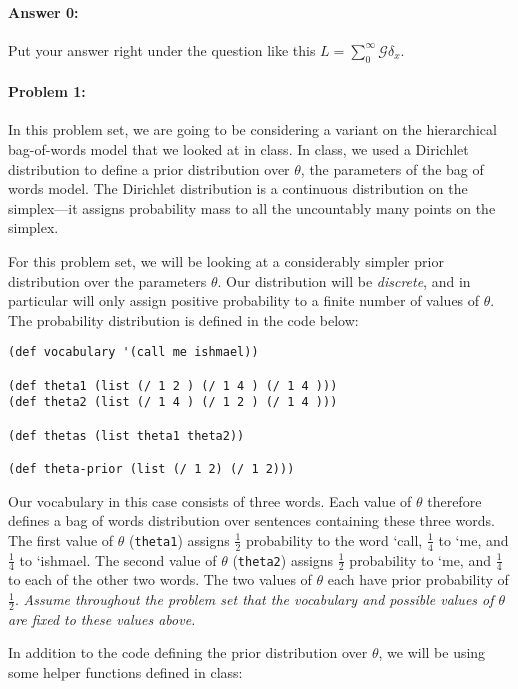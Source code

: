 \documentclass[10pt]{article}
\begin{document}
\paragraph{Answer 0:} Put your answer right under the question like
this $L=\sum_0^{\infty} \mathcal{G} \delta_x$.

\hrulefill
\paragraph{Problem 1:}
In this problem set, we are going to be considering a variant on the
hierarchical bag-of-words model that we looked at in class. In class,
we used a Dirichlet distribution to define a prior distribution over
$\theta$, the parameters of the bag of words model. The Dirichlet
distribution is a continuous distribution on the simplex---it assigns
probability mass to all the uncountably many points on the simplex.

For this problem set, we will be looking at a considerably simpler
prior distribution over the parameters $\theta$. Our distribution will
be \emph{discrete}, and in particular will only assign positive
probability to a finite number of values of $\theta$. The probability
distribution is defined in the code below:

\begin{lstlisting}
(def vocabulary '(call me ishmael))

(def theta1 (list (/ 1 2 ) (/ 1 4 ) (/ 1 4 )))
(def theta2 (list (/ 1 4 ) (/ 1 2 ) (/ 1 4 )))

(def thetas (list theta1 theta2))

(def theta-prior (list (/ 1 2) (/ 1 2)))
\end{lstlisting}

Our vocabulary in this case consists of three words. Each value of
$\theta$ therefore defines a bag of words distribution over sentences
containing these three words. The first value of $\theta$
(\texttt{theta1}) assigns $\frac{1}{2}$ probability to the word `call,
$\frac{1}{4}$ to `me, and $\frac{1}{4}$ to `ishmael. The second value
of $\theta$ (\texttt{theta2}) assigns $\frac{1}{2}$ probability to
`me, and $\frac{1}{4}$ to each of the other two words. The two values
of $\theta$ each have prior probability of $\frac{1}{2}$. \emph{Assume
  throughout the problem set that the vocabulary and possible values
  of $\theta$ are fixed to these values above.}

In addition to the code defining the prior distribution over $\theta$,
we will be using some helper functions defined in class:
\end{document}
